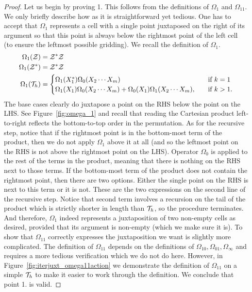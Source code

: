 \documentclass[12pt, a4paper, twoside]{report}
\begin{document}
\begin{proof}
Let us begin by proving 1. This follows from the definitions of $\Omega_1$ and $\Omega_{11}$. We only briefly describe how as it is straightforward yet tedious. One has to accept that $\Omega_1$ represents a cell with a single point juxtaposed on the right of its argument so that this point is always below the rightmost point of the left cell (to ensure the leftmost possible gridding). We recall the definition of $\Omega_1$.
\begin{align*}
    \Omega_1(\mathcal{Z}) &= \mathcal{Z}^*\mathcal{Z}\\
    \Omega_1(\mathcal{Z}^*) &= \mathcal{Z}^*\mathcal{Z}\\
  \Omega_1(\mathcal{T}_h) &=
                      \begin{cases}
                        \Omega_1(X_1^*)\Omega_0(X_2\cdots X_m) \quad &\text{if $k = 1$}\\
                        \Omega_1(X_1)\Omega_0(X_2\cdots X_m) + \Omega_0(X_1)\Omega_1(X_2\cdots X_m),\quad &\text{if $k>1$.}
                      \end{cases}
\end{align*}
The base cases clearly do juxtapose a point on the RHS below the point on the LHS. See Figure~\ref{fig:omega_1} and recall that reading the Cartesian product left-to-right reflects the bottom-to-top order in the permutation. As for the recursive step, notice that if the rightmost point is in the bottom-most term of the product, then we do not apply $\Omega_1$ above it at all (and so the leftmost point on the RHS is not above the rightmost point on the LHS). Operator $\Omega_0$ is applied to the rest of the terms in the product, meaning that there is nothing on the RHS next to those terms. If the bottom-most term of the product does not contain the rightmost point, then there are two options. Either the single point on the RHS is next to this term or it is not. These are the two expressions on the second line of the recursive step. Notice that second term involves a recursion on the tail of the product which is strictly shorter in length than $\mathcal{T}_h$, so the procedure terminates. And therefore, $\Omega_1$ indeed represents a juxtaposition of two non-empty cells as desired, provided that its argument is non-empty (which we make sure it is). To show that $\Omega_{11}$ correctly expresses the juxtaposition we want is slightly more complicated. The definition of $\Omega_{11}$ depends on the definitions of $\Omega_{10}, \Omega_{01}, \Omega_\infty$ and requires a more tedious verification which we do not do here. However, in Figure~\ref{fig:iterjuxt_omega11action} we demonstrate the definition of $\Omega_{11}$ on a simple $\mathcal{T}_h$ to make it easier to work through the definition. We conclude that point 1. is valid.


\end{proof}
\end{document}

